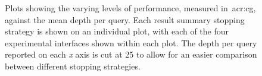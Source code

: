 \begin{figure}[p!]
    \centering
    \caption[Stopping strategies, interfaces and \emph{what-if} performance]{Plots showing the varying levels of performance, measured in~\gls{acr:cg}, against the mean depth per query. Each result summary stopping strategy is shown on an individual plot, with each of the four experimental interfaces shown within each plot. The depth per query reported on each \emph{x} axis is cut at 25 to allow for an easier comparison between different stopping strategies.}
    \label{fig:ch7_sim_perf_plots}
\end{figure}

